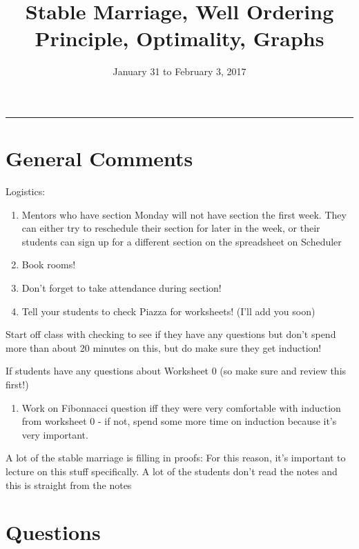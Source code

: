 \documentclass{exam}
\title{Stable Marriage, Well Ordering Principle, Optimality, Graphs}
\date{January 31 to February 3, 2017}
\begin{document}
\maketitle
\rule{\textwidth}{0.15em}
\fontsize{12}{15}\selectfont
\thispagestyle{empty}


\section{General Comments}
\begin{questions}
\item Logistics: 
\begin{enumerate}[label=(\alph*)]
\item Mentors who have section Monday will not have section the first week. They can either try to reschedule their section for later in the week, or their students can sign up for a different section on the spreadsheet on Scheduler
\item Book rooms!
\item Don’t forget to take attendance during section!
\item Tell your students to check Piazza for worksheets! (I’ll add you soon)
\end{enumerate}
\item Start off class with checking to see if they have any questions but don’t spend more than about 20 minutes on this, but do make sure they get induction!
\item If students have any questions about Worksheet 0 (so make sure and review this first!)
\begin{enumerate}[label=(\alph*)]
\item Work on Fibonnacci question iff they were very comfortable with induction from worksheet 0 - if not, spend some more time on induction because it’s very important. 
\end{enumerate}
\item A lot of the stable marriage is filling in proofs: For this reason, it’s important to lecture on this stuff specifically. A lot of the students don’t read the notes and this is straight from the notes
\end{questions}

\clearpage 

\section{Questions}
\end{document}
